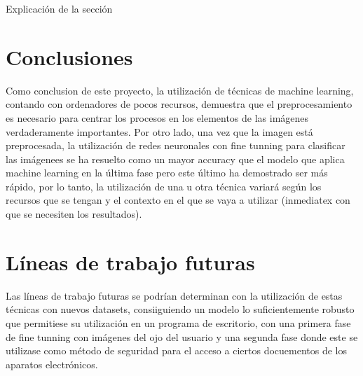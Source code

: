 
Explicación de la sección

\section{Conclusiones}
Como conclusion de este proyecto, la utilización de técnicas de machine learning, contando con ordenadores de pocos recursos, demuestra que el preprocesamiento
es necesario para centrar los procesos en los elementos de las imágenes verdaderamente importantes. Por otro lado, una vez que la imagen está preprocesada, la utilización 
de redes neuronales con fine tunning para clasificar las imágenees se ha resuelto como un mayor accuracy que el modelo que aplica machine learning en la última fase
pero este último ha demostrado ser más rápido, por lo tanto, la utilización de una u otra técnica variará según los recursos que se tengan y el contexto en el que se 
vaya a utilizar (inmediatex con que se necesiten los resultados).

\section{Líneas de trabajo futuras}

Las líneas de trabajo futuras se podrían determinan con la utilización de estas técnicas con nuevos datasets, consiiguiendo un modelo lo suficientemente robusto
que permitiese su utilización en un programa de escritorio, con una primera fase de fine tunning con imágenes del ojo del usuario y una segunda fase donde este 
se utilizase como método de seguridad para el acceso a ciertos docuementos de los aparatos electrónicos.